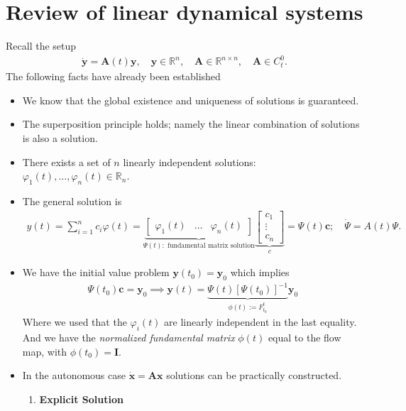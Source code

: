 \section{Review of linear dynamical systems}
Recall the setup
\begin{align}
	\dot{\bm{y} } = \bm{A} (t)\bm{y}, \quad \bm{y} \in \mathbb{R}^{n}, \quad \bm{A} \in \mathbb{R}^{n \times n}, \quad \bm{A} \in C^{0}_{t}.
\end{align}
The following facts have already been established
\begin{itemize}
	\item We know that the global existence and uniqueness of solutions is guaranteed. 
	\item The superposition principle holds; namely the linear combination of solutions is also a solution.
	\item There exists a set of $n$ linearly independent solutions: $\varphi_1(t), \ldots, \varphi_n(t) \in \mathbb{R}_{n}$.
	\item The general solution is
		\begin{align}
			y(t) = \sum_{i=1}^{n} c_i \varphi(t) =
			\underbrace{\begin{bmatrix}
				\varphi_1(t) & \ldots & \varphi_n(t)
		\end{bmatrix}}_{\Psi(t):  \textrm{ fundamental matrix solution} }
		\underbrace{\begin{bmatrix}
			c_1 \\ \vdots \\ c_n
	\end{bmatrix}}_{c}
	= \Psi(t) \bm{c}; \quad \dot{\Psi} = A(t) \Psi.			
		\end{align}
	\item We have the initial value problem $\bm{y} (t_0) = \bm{y} _0$ which implies
		\begin{align}
			\Psi(t_0) \bm{c} = \bm{y} _0 \implies \bm{y} (t) = \underbrace{\Psi(t) \left[\Psi(t_0)\right]^{-1}}_{\phi(t):= F_{t_0}^{t}}\bm{y} _0 
		\end{align}
		Where we used that the $\varphi_i(t)$ are linearly independent in the last equality. And we have the \emph{normalized fundamental matrix} $\phi(t)$ equal to the flow map, with $\phi(t_0)=\bm{I} $.
	\item In the autonomous case $\dot{\bm{x} }= \bm{A} \bm{x} $ solutions can be practically constructed.
	\begin{enumerate} 
		\item \textbf{Explicit Solution} 
		\begin{align}

\end{align}
\end{enumerate}
\end{itemize}
